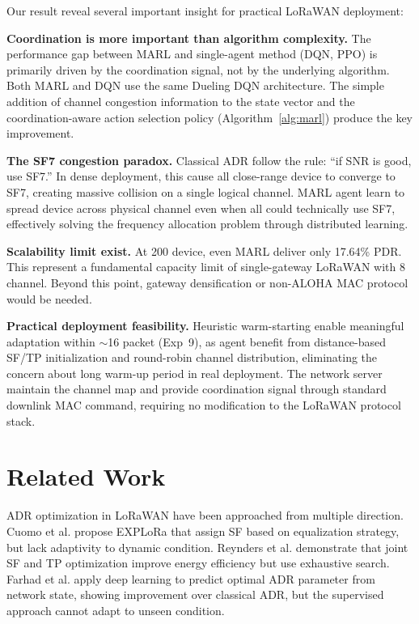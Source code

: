 \documentclass[conference]{IEEEtran}
\begin{document}
Our result reveal several important insight for practical LoRaWAN deployment:

\textbf{Coordination is more important than algorithm complexity.} The performance gap between MARL and single-agent method (DQN, PPO) is primarily driven by the coordination signal, not by the underlying algorithm. Both MARL and DQN use the same Dueling DQN architecture. The simple addition of channel congestion information to the state vector and the coordination-aware action selection policy (Algorithm~\ref{alg:marl}) produce the key improvement.

\textbf{The SF7 congestion paradox.} Classical ADR follow the rule: ``if SNR is good, use SF7.'' In dense deployment, this cause all close-range device to converge to SF7, creating massive collision on a single logical channel. MARL agent learn to spread device across physical channel even when all could technically use SF7, effectively solving the frequency allocation problem through distributed learning.

\textbf{Scalability limit exist.} At 200 device, even MARL deliver only 17.64\% PDR. This represent a fundamental capacity limit of single-gateway LoRaWAN with 8 channel. Beyond this point, gateway densification or non-ALOHA MAC protocol would be needed.

\textbf{Practical deployment feasibility.} Heuristic warm-starting enable meaningful adaptation within $\sim$16 packet (Exp~9), as agent benefit from distance-based SF/TP initialization and round-robin channel distribution, eliminating the concern about long warm-up period in real deployment. The network server maintain the channel map and provide coordination signal through standard downlink MAC command, requiring no modification to the LoRaWAN protocol stack.

\section{Related Work}
\label{sec:related}

ADR optimization in LoRaWAN have been approached from multiple direction. Cuomo et al. \cite{cuomo2017explora} propose EXPLoRa that assign SF based on equalization strategy, but lack adaptivity to dynamic condition. Reynders et al. \cite{reynders2017power} demonstrate that joint SF and TP optimization improve energy efficiency but use exhaustive search. Farhad et al. \cite{farhad2021deep} apply deep learning to predict optimal ADR parameter from network state, showing improvement over classical ADR, but the supervised approach cannot adapt to unseen condition. 
\end{document}
